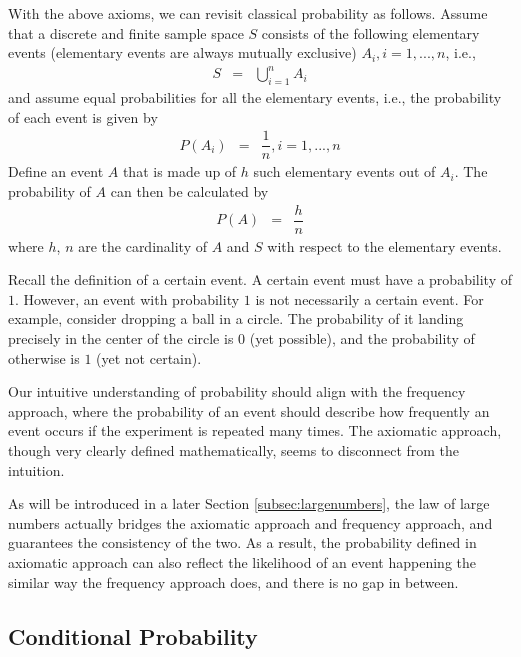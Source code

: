 With the above axioms, we can revisit classical probability as follows. Assume that a discrete and finite sample space $S$ consists of the following elementary events (elementary events are always mutually exclusive) $A_i, i=1,...,n$, i.e.,
\begin{eqnarray}
  S &=& \bigcup_{i=1}^{n} A_i \nonumber
\end{eqnarray}
and assume equal probabilities for all the elementary events, i.e., the probability of each event is given by
\begin{eqnarray}
  P(A_i) &=& \dfrac{1}{n}, i=1,...,n \nonumber
\end{eqnarray}
Define an event $A$ that is made up of $h$ such elementary events out of $A_i$. The probability of $A$ can then be calculated by
\begin{eqnarray}
  P(A) &=& \dfrac{h}{n} \nonumber
\end{eqnarray}
where $h$, $n$ are the cardinality of $A$ and $S$ with respect to the elementary events.

Recall the definition of a certain event. A certain event must have a probability of $1$. However, an event with probability $1$ is not necessarily a certain event. For example, consider dropping a ball in a circle. The probability of it landing precisely in the center of the circle is $0$ (yet possible), and the probability of otherwise is $1$ (yet not certain).

\begin{shortbox}

Our intuitive understanding of probability should align with the frequency approach, where the probability of an event should describe how frequently an event occurs if the experiment is repeated many times. The axiomatic approach, though very clearly defined mathematically, seems to disconnect from the intuition.

As will be introduced in a later Section \ref{subsec:largenumbers}, the law of large numbers actually bridges the axiomatic approach and frequency approach, and guarantees the consistency of the two. As a result, the probability defined in axiomatic approach can also reflect the likelihood of an event happening the similar way the frequency approach does, and there is no gap in between.

\end{shortbox}

\subsection{Conditional Probability}

